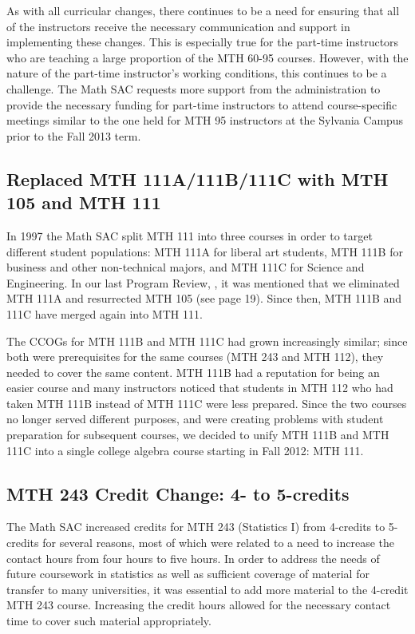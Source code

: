 As with all curricular changes, there continues to be a need for ensuring that
all of the instructors receive the necessary communication and support in
implementing these changes.  This is especially true for the part-time
instructors who are teaching a large proportion of the MTH 60-95 courses.  However,
with the nature of the part-time instructor's working conditions, this continues
to be a challenge.  The Math SAC requests more support from the administration
to provide the necessary funding for part-time instructors to attend
course-specific meetings similar to the one held for MTH 95 instructors at the
Sylvania Campus prior to the Fall 2013 term.
 
\subsection{Replaced MTH 111A/111B/111C with MTH 105 and MTH 111}
In 1997 the Math SAC split MTH 111 into three courses in order to target
different student populations: MTH 111A for liberal art students, MTH 111B for
business and other non-technical majors, and MTH 111C for Science and
Engineering.  In our last Program Review, \cite{mathprogramreview2003}, 
it was mentioned that we eliminated MTH 111A and resurrected MTH 105 (see \cite{mathprogramreview2003} page 19).  
Since then, MTH 111B and 111C have merged again into MTH 111.  

The CCOGs for MTH 111B and MTH 111C had grown
increasingly similar; since both were prerequisites for the same courses
(MTH 243 and MTH 112), they needed to cover the same content.  MTH 111B had a
reputation for being an easier course and many instructors noticed that students
in MTH 112 who had taken MTH 111B instead of MTH 111C were less prepared.  Since
the two courses no longer served different purposes, and were creating problems 
with student preparation for subsequent courses, we decided to unify MTH 111B and MTH 111C into a single
college algebra course starting in Fall 2012: MTH 111.
 
\subsection{MTH 243 Credit Change: 4- to 5-credits}\label{other:sec:mth243}
The Math SAC increased credits for MTH 243 (Statistics I) from 4-credits to
5-credits for several reasons, most of which were related to a need to increase
the contact hours from four hours to five hours.  In order to address the needs
of future coursework in statistics as well as sufficient coverage of material
for transfer to many universities, it was essential to add more material to the
4-credit MTH 243 course.  Increasing the credit hours allowed for the necessary
contact time to cover such material appropriately.
 
